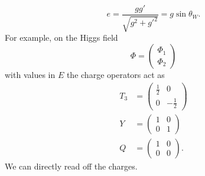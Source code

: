 \documentclass[11pt]{amsart}
\theoremstyle{definition}
\theoremstyle{remark}
\numberwithin{equation}{section}
\begin{document}
\begin{equation*}
e=\frac{gg'}{\sqrt{g^2+g'^2}}=g\sin\theta_W.
\end{equation*}
For example, on the Higgs field 
\begin{equation*}
\Phi=\left(\begin{array}{c}\Phi_1\\\Phi_2\end{array}\right)
\end{equation*}
with values in $E$ the charge operators act as
\begin{align*}
T_3&=\left(\begin{array}{cc}\frac{1}{2} & 0 \\ 0 &-\frac{1}{2}\end{array}\right)\\
Y&=\left(\begin{array}{cc}1 & 0 \\0 & 1\end{array}\right)\\
Q&=\left(\begin{array}{cc}1 & 0 \\0 & 0\end{array}\right).
\end{align*}
We can directly read off the charges.
\end{document}

